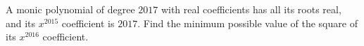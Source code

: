 A monic polynomial of degree $2017$ with real coefficients has all its roots real, and its $x^{2015}$ coefficient is $2017$. Find the minimum possible value of the square of its $x^{2016}$ coefficient.

